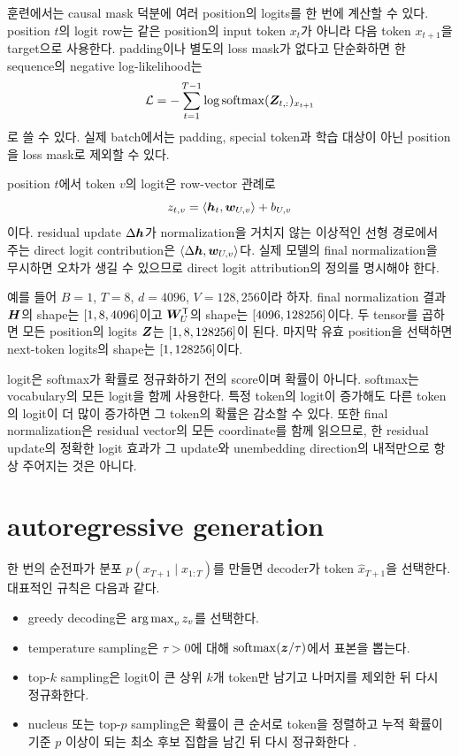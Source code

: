 훈련에서는 causal mask 덕분에 여러 position의 logits를 한 번에 계산할 수 있다.
position $t$의 logit row는 같은 position의 input token $x_t$가 아니라 다음 token $x_{t+1}$을 target으로 사용한다.
padding이나 별도의 loss mask가 없다고 단순화하면 한 sequence의 negative log-likelihood는
\begin{equation}
  \mathcal{L}
  =-\sum_{t=1}^{T-1}
   \log\operatorname{softmax}(\bm{Z}_{t,:})_{x_{t+1}}
\end{equation}
로 쓸 수 있다.
실제 batch에서는 padding, special token과 학습 대상이 아닌 position을 loss mask로 제외할 수 있다.

position $t$에서 token $v$의 logit은 row-vector 관례로
\begin{equation}
  z_{t,v}
  =\langle\bm{h}_{t},\bm{w}_{U,v}\rangle+b_{U,v}
\end{equation}
이다.
residual update $\Delta\bm{h}$가 normalization을 거치지 않는 이상적인 선형 경로에서 주는 direct logit contribution은 $\langle\Delta\bm{h},\bm{w}_{U,v}\rangle$다.
실제 모델의 final normalization을 무시하면 오차가 생길 수 있으므로 direct logit attribution의 정의를 명시해야 한다.

예를 들어 $B=1$, $T=8$, $d=4096$, $V=128{,}256$이라 하자.
final normalization 결과 $\bm{H}$의 shape는 $\left[1,8,4096\right]$이고 $\bm{W}_{U}^{\mathsf T}$의 shape는 $\left[4096,128256\right]$이다.
두 tensor를 곱하면 모든 position의 logits $\bm{Z}$는 $\left[1,8,128256\right]$이 된다.
마지막 유효 position을 선택하면 next-token logits의 shape는 $\left[1,128256\right]$이다.

\begin{factbox}
logit은 softmax가 확률로 정규화하기 전의 score이며 확률이 아니다.
softmax는 vocabulary의 모든 logit을 함께 사용한다.
특정 token의 logit이 증가해도 다른 token의 logit이 더 많이 증가하면 그 token의 확률은 감소할 수 있다.
또한 final normalization은 residual vector의 모든 coordinate를 함께 읽으므로, 한 residual update의 정확한 logit 효과가 그 update와 unembedding direction의 내적만으로 항상 주어지는 것은 아니다.
\end{factbox}

\section{autoregressive generation}

한 번의 순전파가 분포 $p(x_{T+1}\mid x_{1:T})$를 만들면 decoder가 token $\hat{x}_{T+1}$을 선택한다.
대표적인 규칙은 다음과 같다.

\begin{itemize}
  \item greedy decoding은 $\operatorname{arg\,max}_v z_v$를 선택한다.
  \item temperature sampling은 $\tau>0$에 대해 $\operatorname{softmax}(\bm{z}/\tau)$에서 표본을 뽑는다.
  \item top-$k$ sampling은 logit이 큰 상위 $k$개 token만 남기고 나머지를 제외한 뒤 다시 정규화한다.
  \item nucleus 또는 top-$p$ sampling은 확률이 큰 순서로 token을 정렬하고 누적 확률이 기준 $p$ 이상이 되는 최소 후보 집합을 남긴 뒤 다시 정규화한다 \citep{holtzman2020degeneration}.
\end{itemize}

